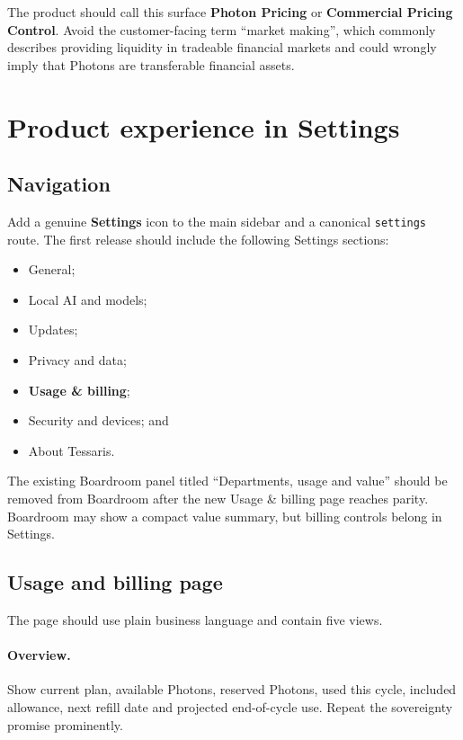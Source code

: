 \documentclass[11pt]{article}
\newcommand{\code}[1]{\texttt{#1}}
\begin{document}
The product should call this surface \textbf{Photon Pricing} or \textbf{Commercial Pricing Control}. Avoid the customer-facing term ``market making'', which commonly describes providing liquidity in tradeable financial markets and could wrongly imply that Photons are transferable financial assets.

\section{Product experience in Settings}

\subsection{Navigation}

Add a genuine \textbf{Settings} icon to the main sidebar and a canonical \code{settings} route. The first release should include the following Settings sections:

\begin{itemize}
  \item General;
  \item Local AI and models;
  \item Updates;
  \item Privacy and data;
  \item \textbf{Usage \& billing};
  \item Security and devices; and
  \item About Tessaris.
\end{itemize}

The existing Boardroom panel titled ``Departments, usage and value'' should be removed from Boardroom after the new Usage \& billing page reaches parity. Boardroom may show a compact value summary, but billing controls belong in Settings.

\subsection{Usage and billing page}

The page should use plain business language and contain five views.

\paragraph{Overview.}
Show current plan, available Photons, reserved Photons, used this cycle, included allowance, next refill date and projected end-of-cycle use. Repeat the sovereignty promise prominently.
\end{document}
